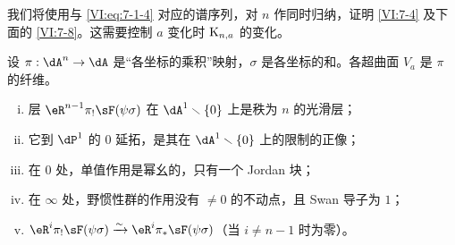 我们将使用与 \eqref{VI:eq:7-1-4} 对应的谱序列，对 $n$ 作同时归纳，证明 \ref{VI:7-4} 及下面的 \ref{VI:7-8}。这需要控制 $a$ 变化时 $\textnormal{K}_{n,a}$ 的变化。

设 $\pi:\dA^n \to \dA$ 是“各坐标的乘积”映射，$\sigma$ 是各坐标的和。各超曲面 $V_a$ 是 $\pi$ 的纤维。

\begin{theorem_}\label{VI:7-8}
\begin{enumerate}[(i)]
  \item 层 $\eR^{n-1}\pi_! \sF(\psi\sigma)$ 在 $\dA^1\setminus \{0\}$ 上是秩为 $n$ 的光滑层；
  \item 它到 $\dP^1$ 的 $0$ 延拓，是其在 $\dA^1\setminus \{0\}$ 上的限制的正像；
  \item 在 $0$ 处，单值作用是幂幺的，只有一个 Jordan 块；
  \item 在 $\infty$ 处，野惯性群的作用没有 $\ne 0$ 的不动点，且 Swan 导子为 $1$；
  \item $\eR^i \pi_! \sF(\psi\sigma) \iso \eR^i \pi_\ast \sF(\psi\sigma)$（当 $i\ne n-1$ 时为零）。
\end{enumerate}
\end{theorem_}
